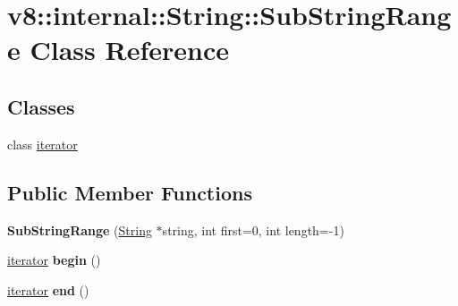 \hypertarget{classv8_1_1internal_1_1_string_1_1_sub_string_range}{}\section{v8\+:\+:internal\+:\+:String\+:\+:Sub\+String\+Range Class Reference}
\label{classv8_1_1internal_1_1_string_1_1_sub_string_range}
\subsection*{Classes}
\begin{DoxyCompactItemize}
\item 
class \hyperlink{classv8_1_1internal_1_1_string_1_1_sub_string_range_1_1iterator}{iterator}
\end{DoxyCompactItemize}
\subsection*{Public Member Functions}
\begin{DoxyCompactItemize}
\item 
{\bfseries Sub\+String\+Range} (\hyperlink{classv8_1_1internal_1_1_string}{String} $\ast$string, int first=0, int length=-\/1)\hypertarget{classv8_1_1internal_1_1_string_1_1_sub_string_range_afe748a31b3c689b2bac9b9a6485c5fd6}{}\label{classv8_1_1internal_1_1_string_1_1_sub_string_range_afe748a31b3c689b2bac9b9a6485c5fd6}

\item 
\hyperlink{classv8_1_1internal_1_1_string_1_1_sub_string_range_1_1iterator}{iterator} {\bfseries begin} ()\hypertarget{classv8_1_1internal_1_1_string_1_1_sub_string_range_a181849e8d6ead2e7c39da2aa3ad5504d}{}\label{classv8_1_1internal_1_1_string_1_1_sub_string_range_a181849e8d6ead2e7c39da2aa3ad5504d}

\item 
\hyperlink{classv8_1_1internal_1_1_string_1_1_sub_string_range_1_1iterator}{iterator} {\bfseries end} ()\hypertarget{classv8_1_1internal_1_1_string_1_1_sub_string_range_a0db9b1c8e58232224878366048358899}{}\label{classv8_1_1internal_1_1_string_1_1_sub_string_range_a0db9b1c8e58232224878366048358899}

\end{DoxyCompactItemize}
